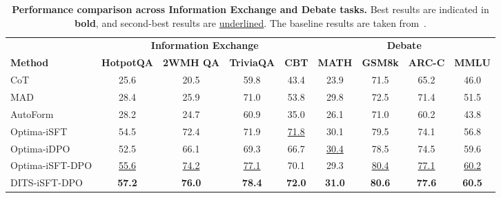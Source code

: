 \begin{table*}[t]
    \centering
    \caption{\textbf{Performance comparison across Information Exchange and Debate tasks.} Best results are indicated in \textbf{bold}, and second-best results are \underline{underlined}. The baseline results are taken from~\cite{DBLP:journals/corr/abs-2410-08115}.}
    \vskip 0.1in
    \begin{tabular}{lcccccccc}
    \toprule
    & \multicolumn{4}{c}{\textbf{Information Exchange}} & \multicolumn{4}{c}{\textbf{Debate}} \\
    \cmidrule(lr){2-5} \cmidrule(lr){6-9}
     \textbf{Method} & \multicolumn{1}{c}{\textbf{HotpotQA}} & \multicolumn{1}{c}{\textbf{2WMH QA}}  &\multicolumn{1}{c}{\textbf{TriviaQA}} & \multicolumn{1}{c}{\textbf{CBT}}& \multicolumn{1}{c}{\textbf{MATH}} & \multicolumn{1}{c}{\textbf{GSM8k}} & \multicolumn{1}{c}{\textbf{ARC-C}}&\multicolumn{1}{c}{\textbf{MMLU}} \\
    
    \midrule
    CoT & 25.6  &20.5  &59.8  &43.4 &23.9 & 71.5 & 65.2  & 46.0 \\
    \midrule
    MAD &  28.4  &25.9& 71.0 & 53.8 &29.8 & 72.5 & 71.4 & 51.5\\
    AutoForm & 28.2  &24.7  & 60.9  & 35.0  &26.1 & 71.0 & 60.2  & 43.8 \\
    \midrule
    Optima-iSFT 
   
     & 54.5 & 72.4  & 71.9  & \underline{71.8} &30.1  & 79.5 & 74.1  & 56.8\\
    Optima-iDPO 
     
     & 52.5  & 66.1  & 69.3  & 66.7 &\underline{30.4}  & 78.5 & 74.5  & 59.6 \\
    Optima-iSFT-DPO 
      & \underline{55.6}  & \underline{74.2}  & \underline{77.1}  & 70.1 &29.3  & \underline{80.4} & \underline{77.1}  & \underline{60.2} \\
      \midrule
    DITS-iSFT-DPO  & \textbf{57.2} & \textbf{76.0} & \textbf{78.4} & \textbf{72.0}  & \textbf{31.0} &  \textbf{80.6} & \textbf{77.6} & \textbf{60.5} \\
    
    
    \bottomrule
    \end{tabular}
    \label{tab:main-table}
\end{table*}